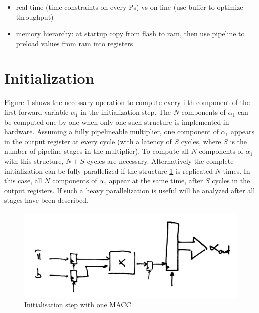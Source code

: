 \documentclass[mscthesis]{usiinfthesis}
\begin{document}
\begin{itemize}
    \item real-time (time constraints on every Ps) vs on-line (use buffer to
        optimize throughput)
    \item memory hierarchy: at startup copy from flash to ram, then use pipeline
        to preload values from ram into registers.
\end{itemize}

\section{Initialization}

Figure \ref{fig:init_s} shows the necessary operation to compute every i-th
component of the first forward variable $ \alpha_1 $ in the initialization
step.  The $ N $ components of $ \alpha_1 $ can be computed one by one when
only one such structure is implemented in hardware. Assuming a fully
pipelineable multiplier, one component of $ \alpha_1 $ appears in the output
register at every cycle (with a latency of $ S $ cycles, where $ S $ is the
number of pipeline stages in the multiplier). To compute all $ N $ components
of $ \alpha_1 $ with this structure, $ N + S $ cycles are necessary.
Alternatively the complete initialization can be fully parallelized if the
structure \ref{fig:init_s} is replicated $ N $ times. In this case, all
$ N $ components of $ \alpha_1 $ appear at the same time, after $ S $ cycles in
the output registers. If such a heavy parallelization is useful will be
analyzed after all stages have been described.

\begin{figure}
    \includegraphics[width=1\columnwidth]{./schema/arch_init_s.png}
    \caption{Initialisation step with one MACC}
    \label{fig:init_s}
\end{figure}
\end{document}
